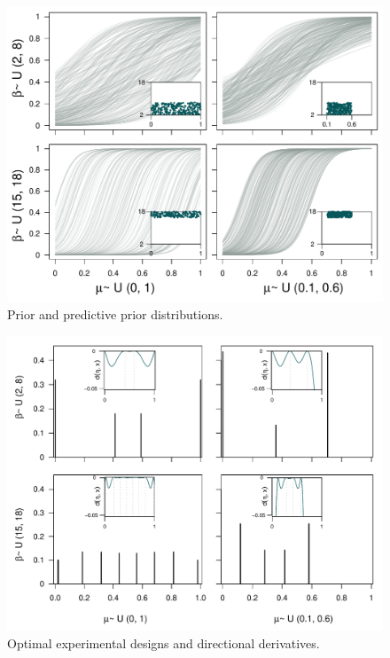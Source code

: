 \documentclass[preprint,review,12pt]{elsarticle}
\begin{document}
\begin{figure}
\includegraphics[width=\textwidth]{Prior_and_Predictive.pdf}
\caption{Prior and predictive prior distributions.}
\label{fig:ppd}
\end{figure}

\begin{figure}
\includegraphics[width=\textwidth]{Support_detadx.pdf}
\caption{Optimal experimental designs and directional derivatives.}
\label{fig:detadx}
\end{figure}
\end{document}
